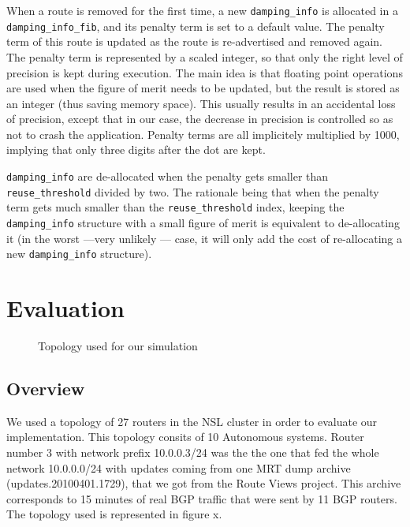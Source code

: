 \documentclass[a4paper,english]{IEEEtran}
\begin{document}
When a route is removed for the first time, a new {\tt\small damping\_info} is allocated in a {\tt\small damping\_info\_fib}, and its penalty term is set to a default value.
The penalty term of this route is updated as the route is re-advertised and removed again.
The penalty term is represented by a scaled integer, so that only the right level of precision is kept during execution.
The main idea is that floating point operations are used when the figure of merit needs to be updated, but the result is stored as an integer (thus saving memory space).
This usually results in an accidental loss of precision, except that in our case, the decrease in precision is controlled so as not to crash the application.
Penalty terms are all implicitely multiplied by 1000, implying that only three digits after the dot are kept.

{\tt\small damping\_info} are de-allocated when the penalty gets smaller than {\tt\small reuse\_threshold} divided by two.
The rationale being that when the penalty term gets much smaller than the {\tt\small reuse\_threshold} index, keeping the {\tt\small damping\_info} structure with a small figure of merit is equivalent to de-allocating it (in the worst ---very unlikely --- case, it will only add the cost of re-allocating a new {\tt\small damping\_info} structure).

\section{Evaluation}

\begin{figure}
\caption{Topology used for our simulation}

\end{figure}

\subsection{Overview}

We used a topology of 27 routers in the NSL cluster in order to evaluate
our implementation. This topology consits of 10 Autonomous systems.
Router number 3 with network prefix 10.0.0.3/24 was the the one that
fed the whole network 10.0.0.0/24 with updates coming from one MRT
dump archive (updates.20100401.1729), that we got from the Route Views
project\cite{routeviews}. This archive corresponds to 15 minutes
of real BGP traffic that were sent by 11 BGP routers. The topology
used is represented in figure x.
\end{document}
